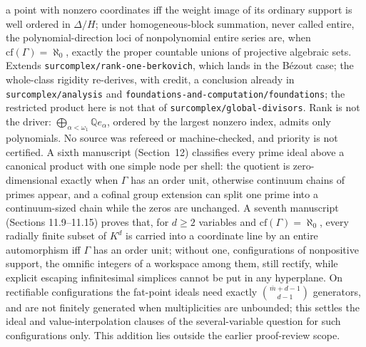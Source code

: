 \documentclass[11pt]{article}
\newcommand{\Q}{\mathbb{Q}}
\begin{document}
{a point with nonzero coordinates iff the weight image of its ordinary support is
well ordered in $\Delta/H$; under homogeneous-block summation, never called
entire, the polynomial-direction loci of nonpolynomial entire series are, when
$\mathrm{cf}(\Gamma)=\aleph_0$, exactly the proper countable unions of
projective algebraic sets.  Extends \nolinkurl{surcomplex/rank-one-berkovich},
which lands in the B\'ezout case; the whole-class rigidity re-derives, with
credit, a conclusion already in \nolinkurl{surcomplex/analysis} and
\nolinkurl{foundations-and-computation/foundations}; the restricted product here
is not that of \nolinkurl{surcomplex/global-divisors}.  Rank is not the driver:
$\bigoplus_{\alpha<\omega_1}\Q e_\alpha$, ordered by the largest nonzero index,
admits only polynomials.  No source was refereed or machine-checked, and
priority is not certified.  A sixth manuscript (Section~12) classifies every prime ideal above a
canonical product with one simple node per shell: the quotient is
zero-dimensional exactly when $\Gamma$ has an order unit, otherwise continuum
chains of primes appear, and a cofinal group extension can split one prime into
a continuum-sized chain while the zeros are unchanged.  A seventh manuscript
(Sections 11.9--11.15) proves that, for $d\ge2$ variables and
$\mathrm{cf}(\Gamma)=\aleph_0$, every radially finite subset of $K^d$ is
carried into a coordinate line by an entire automorphism iff $\Gamma$ has an
order unit; without one, configurations of nonpositive support, the omnific
integers of a workspace among them, still rectify, while explicit escaping
infinitesimal simplices cannot be put in any hyperplane.  On rectifiable
configurations the fat-point ideals need exactly
$\binom{\bar m+d-1}{d-1}$ generators, and are not finitely generated when
multiplicities are unbounded; this settles the ideal and value-interpolation
clauses of the several-variable question for such configurations only.  This
addition lies outside the earlier proof-review scope.}
\end{document}
